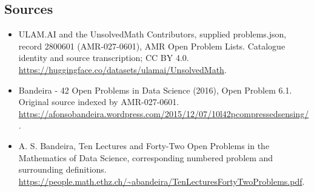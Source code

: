 \documentclass[11pt,a4paper]{article}
\begin{document}
\subsection{Sources}
\begin{itemize}
\item[S1] ULAM.AI and the UnsolvedMath Contributors, supplied problems.json, record 2800601 (AMR-027-0601), AMR Open Problem Lists. Catalogue identity and source transcription; CC BY 4.0.
\url{https://huggingface.co/datasets/ulamai/UnsolvedMath}.
\item[S2] Bandeira - 42 Open Problems in Data Science (2016), Open Problem 6.1. Original source indexed by AMR-027-0601.
\url{https://afonsobandeira.wordpress.com/2015/12/07/10l42pcompressedsensing/}.
\item[S3] A. S. Bandeira, Ten Lectures and Forty-Two Open Problems in the Mathematics of Data Science, corresponding numbered problem and surrounding definitions.
\url{https://people.math.ethz.ch/~abandeira/TenLecturesFortyTwoProblems.pdf}.
\end{itemize}
\end{document}
